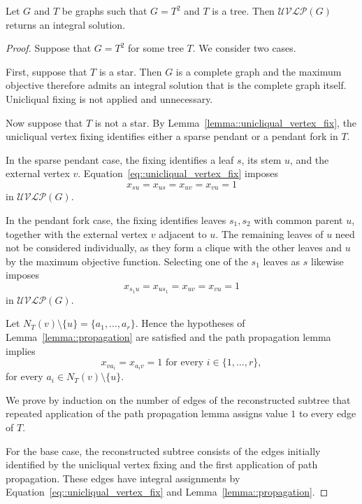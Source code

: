 \begin{theorem} \label{theorem::unicliqual_vertex_induction_proof}
  Let $G$ and $T$ be graphs such that $G=T^2$ and $T$ is a tree. Then $\mathcal{UVLP}(G)$ returns an integral solution.
\end{theorem}
\begin{proof}
  Suppose that $G=T^2$ for some tree $T$. We consider two cases. 
  
  First, suppose that $T$ is a star. Then $G$ is a complete graph and the maximum objective therefore admits an integral solution that is the complete graph itself. Unicliqual fixing is not applied and unnecessary. 

  Now suppose that $T$ is not a star. By Lemma~\ref{lemma::unicliqual_vertex_fix}, the unicliqual vertex fixing identifies either a sparse pendant or a pendant fork in $T$.
  
  In the sparse pendant case, the fixing identifies a leaf $s$, its stem $u$, and the external vertex $v$. Equation~\eqref{eq::unicliqual_vertex_fix} imposes 
  \[ 
  x_{su}=x_{us}=x_{uv}=x_{vu}=1 
  \] 
  in $\mathcal{UVLP}(G)$. 
  
  In the pendant fork case, the fixing identifies leaves $s_1,s_2$ with common parent $u$, together with the external vertex $v$ adjacent to $u$. The remaining leaves of $u$ need not be considered individually, as they form a clique with the other leaves and $u$ by the maximum objective function. Selecting one of the $s_1$ leaves as $s$ likewise imposes 
  \[ 
  x_{s_1u}=x_{us_1}=x_{uv}=x_{vu}=1 
  \] 
  in $\mathcal{UVLP}(G)$. 
  
  Let $N_T(v)\setminus\{u\} = \{a_1,\ldots,a_r\}$. Hence the hypotheses of Lemma~\ref{lemma::propagation} are satisfied and the path propagation lemma implies
  \[
  x_{va_i}=x_{a_iv}=1 \text{ for every } i \in \{1,\ldots,r\},
  \]
  for every $a_i \in N_T(v)\setminus\{u\}$. 

  We prove by induction on the number of edges of the reconstructed subtree that repeated application of the path propagation lemma assigns value $1$ to every edge of $T$. 
    
  For the base case, the reconstructed subtree consists of the edges initially identified by the unicliqual vertex fixing and the first application of path propagation. These edges have integral assignments by Equation~\eqref{eq::unicliqual_vertex_fix} and Lemma~\ref{lemma::propagation}. 
  

\end{proof}
